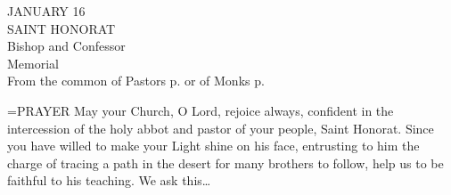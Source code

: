 \begin{center}\normalsize JANUARY 16\\
\footnotesize SAINT HONORAT\\
\footnotesize Bishop and Confessor\\
\footnotesize Memorial\\
\footnotesize From the common of Pastors p.    or of Monks p.  \\
\end{center}

\hangindent=\parindent \small{PRAYER 
May your Church, O Lord, rejoice always, confident in the
intercession of the holy abbot and pastor of your people, Saint
Honorat. Since you have willed to make your Light shine on his
face, entrusting to him the charge of tracing a path in the desert for
many brothers to follow, help us to be faithful to his teaching. We
ask this…
 \\}
 
